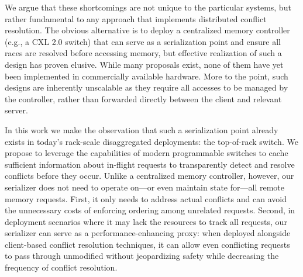 We argue that these shortcomings are not unique to the particular
systems, but rather fundamental to any approach that implements
distributed conflict resolution.
%
%
The obvious alternative is to deploy a centralized memory controller
(e.g., a CXL 2.0 switch) that can serve as a serialization point and
ensure all races are resolved before accessing memory, but effective
realization of such a design has proven elusive.  While many proposals
exist, none of them have yet been implemented in commercially
available hardware.  More to the point, such designs are inherently
unscalable as they require all accesses to be managed by the
controller, rather than forwarded directly between the client and
relevant server.

In this work we make the observation that such a serialization point
already exists in today's rack-scale disaggregated deployments: the
top-of-rack switch.  We propose to leverage the capabilities of modern
programmable switches to cache sufficient information about in-flight
requests to transparently detect and resolve conflicts before they
occur.  Unlike a centralized memory controller, however,
our serializer does not need to operate on---or even maintain state for---all
remote memory requests.  First, it only needs to address actual conflicts
and can avoid the unnecessary costs of enforcing ordering among
unrelated requests.  Second, in deployment scenarios where it may
lack the resources to track all requests, our serializer can serve as a
performance-enhancing proxy: when deployed alongside client-based
conflict resolution techniques, it can allow even conflicting requests
to pass through unmodified without jeopardizing safety while
decreasing the frequency of conflict resolution.

